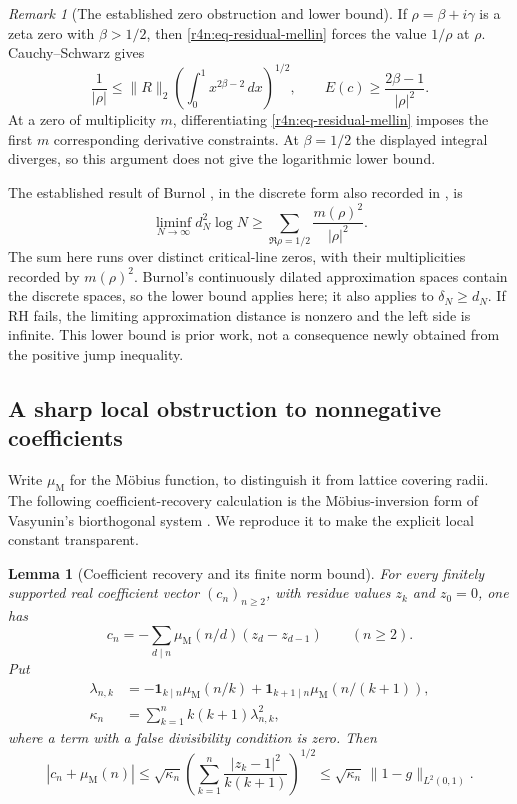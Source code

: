 \documentclass[11pt,a4paper]{article}
\newtheorem{lemma}[theorem]{Lemma}
\theoremstyle{definition}\newtheorem{definition}[theorem]{Definition}
\theoremstyle{remark}\newtheorem{remark}[theorem]{Remark}
\numberwithin{equation}{section}
\begin{document}
\begin{remark}[The established zero obstruction and lower bound]
\label{r4n:rem-zeros}
If $\rho=\beta+i\gamma$ is a zeta zero with $\beta>1/2$, then
\eqref{r4n:eq-residual-mellin} forces the value $1/\rho$ at $\rho$.
Cauchy--Schwarz gives
\[
 \frac1{|\rho|}
 \le\|R\|_2\left(\int_0^1x^{2\beta-2}\,dx\right)^{1/2},
 \qquad
 E(c)\ge\frac{2\beta-1}{|\rho|^2}.
\]
At a zero of multiplicity $m$, differentiating
\eqref{r4n:eq-residual-mellin} imposes the first $m$ corresponding
derivative constraints.
At $\beta=1/2$ the displayed integral diverges, so this argument
does not give the logarithmic lower bound.

The established result of Burnol \cite[Theorem~1.3]{Burnol},
in the discrete form also recorded in \cite{MaierRassias}, is
\[
 \liminf_{N\to\infty}d_N^2\log N
 \ge\sum_{\Re\rho=1/2}\frac{m(\rho)^2}{|\rho|^2}.
\]
The sum here runs over distinct critical-line zeros, with their
multiplicities recorded by $m(\rho)^2$.
Burnol's continuously dilated approximation spaces contain the
discrete spaces, so the lower bound applies here; it also applies
to $\delta_N\ge d_N$.
If RH fails, the limiting approximation distance is nonzero and
the left side is infinite.
This lower bound is prior work, not a consequence newly obtained
from the positive jump inequality.
\end{remark}

\subsection{A sharp local obstruction to nonnegative coefficients}
\label{r4n:subsec-positivity}

Write $\mu_{\mathrm M}$ for the M\"obius function, to distinguish it
from lattice covering radii.
The following coefficient-recovery calculation is the
M\"obius-inversion form of Vasyunin's biorthogonal system
\cite[Section~2]{Balazard}.
We reproduce it to make the explicit local constant transparent.

\begin{lemma}[Coefficient recovery and its finite norm bound]
\label{r4n:lem-recovery}
For every finitely supported real coefficient vector $(c_n)_{n\ge2}$,
with residue values $z_k$ and $z_0=0$, one has
\begin{equation}
\label{r4n:eq-recovery}
 c_n=-\sum_{d\mid n}\mu_{\mathrm M}(n/d)(z_d-z_{d-1})
                    \qquad(n\ge2).
\end{equation}
Put
\[
 \begin{aligned}
 \lambda_{n,k}
 &=-\mathbf1_{k\mid n}\mu_{\mathrm M}(n/k)
   +\mathbf1_{k+1\mid n}\mu_{\mathrm M}(n/(k+1)),
 \\
 \kappa_n&=\sum_{k=1}^n k(k+1)\lambda_{n,k}^2,
 \end{aligned}
\]
where a term with a false divisibility condition is zero.
Then
\begin{equation}
\label{r4n:eq-coefficient-error}
 |c_n+\mu_{\mathrm M}(n)|
 \le\sqrt{\kappa_n}
 \left(\sum_{k=1}^n\frac{|z_k-1|^2}{k(k+1)}\right)^{1/2}
 \le\sqrt{\kappa_n}\,\|1-g\|_{L^2(0,1)}.
\end{equation}
\end{lemma}
\end{document}
